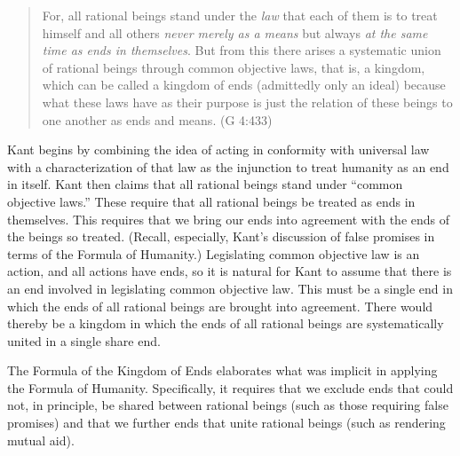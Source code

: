\begin{quote}
For, all rational beings stand under the \emph{law} that each of them is to treat himself and all others \emph{never merely as a means} but always \emph{at the same time as ends in themselves}. But from this there arises a systematic union of rational beings through common objective laws, that is, a kingdom, which can be called a kingdom of ends (admittedly only an ideal) because what these laws have as their purpose is just the relation of these beings to one another as ends and means. (G 4:433)
\end{quote}

Kant begins by combining the idea of acting in conformity with universal law with a characterization of that law as the injunction to treat humanity as an end in itself. Kant then claims that all rational beings stand under ``common objective laws.'' These require that all rational beings be treated as ends in themselves. This requires that we bring our ends into agreement with the ends of the beings so treated. (Recall, especially, Kant's discussion of false promises in terms of the Formula of Humanity.) Legislating common objective law is an action, and all actions have ends, so it is natural for Kant to assume that there is an end involved in legislating common objective law. This must be a single end in which the ends of all rational beings are brought into agreement. There would thereby be a kingdom in which the ends of all rational beings are systematically united in a single share end.

The Formula of the Kingdom of Ends elaborates what was implicit in applying the Formula of Humanity. Specifically, it requires that we exclude ends that could not, in principle, be shared between rational beings (such as those requiring false promises) and that we further ends that unite rational beings (such as rendering mutual aid). \change

